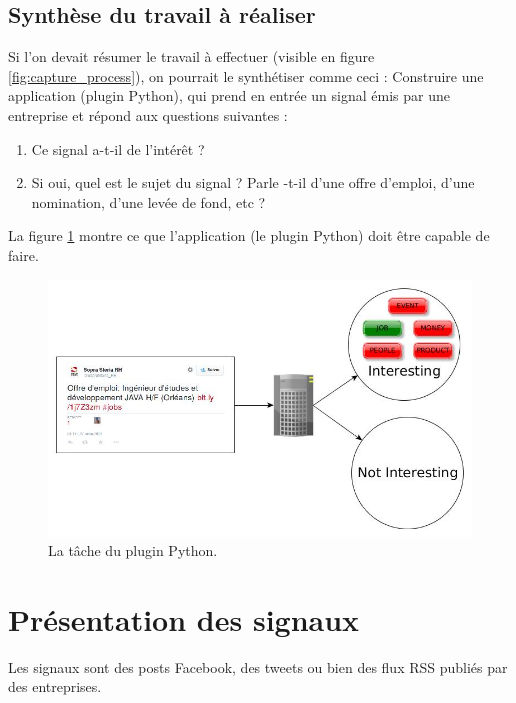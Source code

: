     \subsection{Synthèse du travail à réaliser}
        Si l'on devait résumer le travail à effectuer (visible en figure \ref{fig:capture_process}), on pourrait le synthétiser comme ceci : Construire une application (plugin Python), qui prend en entrée un signal émis par une entreprise et répond aux questions suivantes :
        \begin{enumerate}
            \item Ce signal a-t-il de l'intérêt ?
            \item Si oui, quel est le sujet du signal ? Parle -t-il d'une offre d'emploi, d'une nomination, d'une levée de fond, etc ?
        \end{enumerate}
        La figure \ref{fig:process} montre ce que l'application (le plugin Python) doit être capable de faire.

        \begin{figure}[h!]
            \centering
            \includegraphics[width=\textwidth]{images/process.jpg}
            \caption{La tâche du plugin Python.}
            \label{fig:process}
        \end{figure}

\section{Présentation des signaux}
\label{sec:etat_bd}
    Les signaux sont des posts Facebook, des tweets ou bien des flux RSS publiés par des entreprises.

